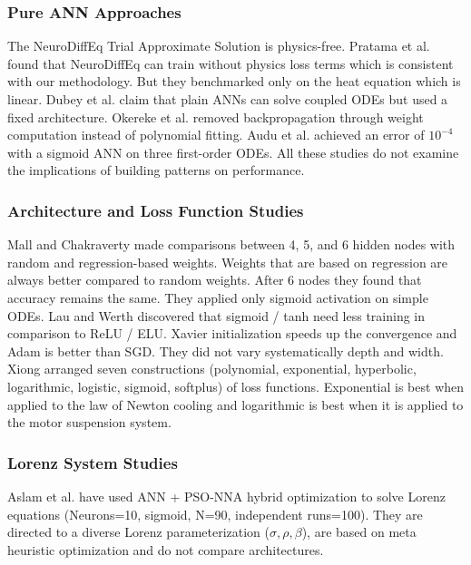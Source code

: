 \subsubsection{Pure ANN Approaches}

The NeuroDiffEq Trial Approximate Solution is physics-free. Pratama et al. \cite{pratama2022ann} found that NeuroDiffEq can train without physics loss terms which is consistent with our methodology. But they benchmarked only on the heat equation which is linear. Dubey et al. \cite{dubey2024solving} claim that plain ANNs can solve coupled ODEs but used a fixed architecture. Okereke et al. \cite{okereke2021novel} removed backpropagation through weight computation instead of polynomial fitting. Audu et al. \cite{audu2024utilizing} achieved an error of $10^{-4}$ with a sigmoid ANN on three first-order ODEs. All these studies do not examine the implications of building patterns on performance.

\subsubsection{Architecture and Loss Function Studies}

Mall and Chakraverty \cite{mall2013comparison} made comparisons between 4, 5, and 6 hidden nodes with random and regression-based weights. Weights that are based on regression are always better compared to random weights. After 6 nodes they found that accuracy remains the same. They applied only sigmoid activation on simple ODEs. Lau and Werth \cite{lau2020oden} discovered that sigmoid / tanh need less training in comparison to ReLU / ELU. Xavier initialization speeds up the convergence and Adam is better than SGD. They did not vary systematically depth and width. Xiong \cite{xiong2022new} arranged seven constructions (polynomial, exponential, hyperbolic, logarithmic, logistic, sigmoid, softplus) of loss functions. Exponential is best when applied to the law of Newton cooling and logarithmic is best when it is applied to the motor suspension system.

\subsubsection{Lorenz System Studies}

Aslam et al. \cite{aslam2024neuro} have used ANN + PSO-NNA hybrid optimization to solve Lorenz equations (Neurons=10, sigmoid, N=90, independent runs=100). They are directed to a diverse Lorenz parameterization ($\sigma, \rho, \beta$), are based on meta heuristic optimization and do not compare architectures.

